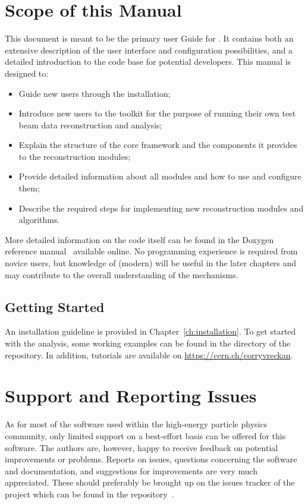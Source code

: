 \section{Scope of this Manual}
This document is meant to be the primary user Guide for \corry.
It contains both an extensive description of the user interface and configuration possibilities, and a detailed introduction to the code base for potential developers.
This manual is designed to:
\begin{itemize}
\item Guide new users through the installation;
\item Introduce new users to the toolkit for the purpose of running their own test beam data reconstruction and analysis;
\item Explain the structure of the core framework and the components it provides to the reconstruction modules;
\item Provide detailed information about all modules and how to use and configure them;
\item Describe the required steps for implementing new reconstruction modules and algorithms.
\end{itemize}

More detailed information on the code itself can be found in the Doxygen reference manual~\cite{corry-doxygen} available online.
No programming experience is required from novice users, but knowledge of (modern) \CPP will be useful in the later chapters and may contribute to the overall understanding of the mechanisms.

\subsection{Getting Started}
An installation guideline is provided in Chapter~\ref{ch:installation}.
To get started with the analysis, some working examples can be found in the  directory of the repository.
In addition, tutorials are available on \url{https://cern.ch/corryvreckan}.

\section{Support and Reporting Issues}
As for most of the software used within the high-energy particle physics community, only limited support on a best-effort basis can be offered for this software.
The authors are, however, happy to receive feedback on potential improvements or problems.
Reports on issues, questions concerning the software and documentation, and suggestions for improvements are very much appreciated.
These should preferably be brought up on the issues tracker of the project which can be found in the repository~\cite{corry-issue-tracker}.


